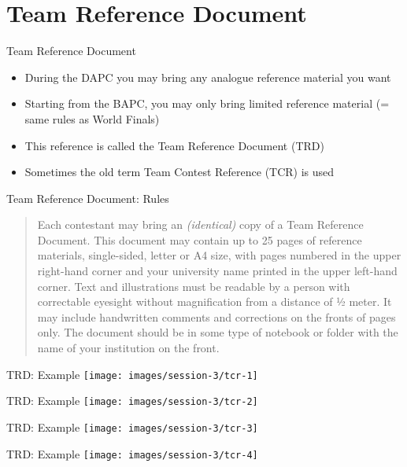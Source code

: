 \documentclass[11pt,pdf, aspectratio=169]{beamer}
\begin{document}
  \section{Team Reference Document}
  \begin{frame}{Team Reference Document}
    \begin{itemize}
      \item During the DAPC you may bring any analogue reference material you want
      \item Starting from the BAPC, you may only bring limited reference material
      (= same rules as World Finals)
      \item This reference is called the Team Reference Document (TRD)
      \item Sometimes the old term Team Contest Reference (TCR) is used
    \end{itemize}
  \end{frame}
  \begin{frame}{Team Reference Document: Rules}
    \begin{quote}
      Each contestant may bring an \emph{(identical)} copy of a Team Reference Document.
      This document may contain up to 25 pages of reference materials, single-sided, letter or A4 size, with pages numbered in the upper right-hand corner and your university name printed in the upper left-hand corner.
      Text and illustrations must be readable by a person with correctable eyesight without magnification from a distance of ½ meter.
      It may include handwritten comments and corrections on the fronts of pages only.
      The document should be in some type of notebook or folder with the name of your institution on the front.
    \end{quote}
  \end{frame}
  \begin{frame}{TRD: Example}
    \texttt{[image: images/session-3/tcr-1]}
  \end{frame}
  \begin{frame}{TRD: Example}
    \texttt{[image: images/session-3/tcr-2]}
  \end{frame}
  \begin{frame}{TRD: Example}
    \texttt{[image: images/session-3/tcr-3]}
  \end{frame}
  \begin{frame}{TRD: Example}
    \texttt{[image: images/session-3/tcr-4]}
  \end{frame}
\end{document}
